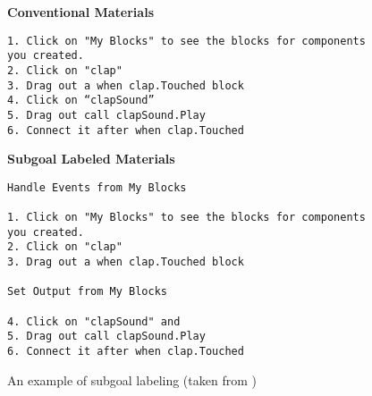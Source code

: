 \documentclass[10pt,letterpaper]{article}
\begin{document}
\begin{figure}[h]
\begin{mdframed}
\noindent
\textbf{Conventional Materials}
\begin{verbatim}
1. Click on "My Blocks" to see the blocks for components you created.
2. Click on "clap"
3. Drag out a when clap.Touched block
4. Click on “clapSound”
5. Drag out call clapSound.Play
6. Connect it after when clap.Touched
\end{verbatim}

\noindent
\textbf{Subgoal Labeled Materials}
\begin{verbatim}
Handle Events from My Blocks

1. Click on "My Blocks" to see the blocks for components you created.
2. Click on "clap"
3. Drag out a when clap.Touched block

Set Output from My Blocks

4. Click on "clapSound" and
5. Drag out call clapSound.Play
6. Connect it after when clap.Touched
\end{verbatim}
\end{mdframed}
\caption{An example of subgoal labeling (taken from \cite{margulieux})}
\label{fig:subgoal}
\end{figure}


%
%

\pagebreak


\end{document}
